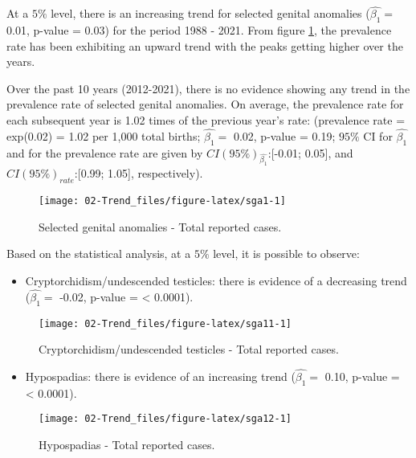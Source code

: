 \documentclass[
]{krantz}
\providecommand{\tightlist}{%
  \setlength{\itemsep}{0pt}\setlength{\parskip}{0pt}}
\begin{document}
At a \(5\%\) level, there is an increasing trend for selected genital anomalies (\(\hat{\beta_{1}} =\) 0.01, p-value = 0.03) for the period 1988 - 2021. From figure \ref{fig:sga1}, the prevalence rate has been exhibiting an upward trend with the peaks getting higher over the years.

Over the past 10 years (2012-2021), there is no evidence showing any trend in the prevalence rate of selected genital anomalies. On average, the prevalence rate for each subsequent year is 1.02 times of the previous year's rate: (prevalence rate = exp(0.02) = 1.02 per 1,000 total births; \(\hat{\beta_{1}} =\) 0.02, p-value = 0.19; \(95\%\) CI for \(\hat{\beta_{1}}\) and for the prevalence rate are given by \(CI(95\%)_{\hat{\beta_{1}}}\):{[}-0.01; 0.05{]}, and \(CI(95\%)_{rate}\):{[}0.99; 1.05{]}, respectively).

\begin{figure}[h]

{\centering \texttt{[image: 02-Trend\_files/figure-latex/sga1-1]} 

}

\caption{Selected genital anomalies - Total reported cases.}\label{fig:sga1}
\end{figure}

Based on the statistical analysis, at a \(5\%\) level, it is possible to observe:

\begin{itemize}
\tightlist
\item
  Cryptorchidism/undescended testicles: there is evidence of a decreasing trend (\(\hat{\beta_{1}} =\) -0.02, p-value = \textless{} 0.0001).
\end{itemize}

\begin{figure}[h]

{\centering \texttt{[image: 02-Trend\_files/figure-latex/sga11-1]} 

}

\caption{Cryptorchidism/undescended testicles - Total reported cases.}\label{fig:sga11}
\end{figure}

\begin{itemize}
\tightlist
\item
  Hypospadias: there is evidence of an increasing trend (\(\hat{\beta_{1}} =\) 0.10, p-value = \textless{} 0.0001).
\end{itemize}

\begin{figure}[h]

{\centering \texttt{[image: 02-Trend\_files/figure-latex/sga12-1]} 

}

\caption{Hypospadias - Total reported cases.}\label{fig:sga12}
\end{figure}
\end{document}
